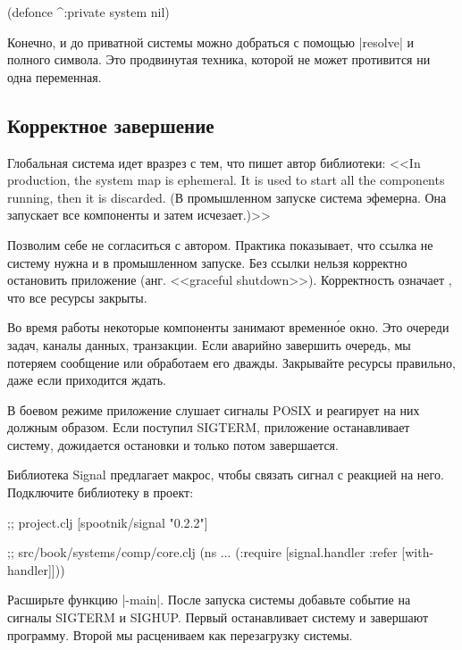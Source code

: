 \begin{english}
  \begin{clojure}
(defonce ^:private system nil)
  \end{clojure}
\end{english}

Конечно, и до приватной системы можно добраться с помощью \spverb|resolve| и
полного символа. Это продвинутая техника, которой не может противится ни одна
переменная.

\subsection{Корректное завершение}

Глобальная система идет вразрез с тем, что пишет автор библиотеки: <<In
production, the system map is ephemeral. It is used to start all the components
running, then it is discarded. (В промышленном запуске система эфемерна. Она
запускает все компоненты и затем исчезает.)>>

Позволим себе не согласиться с автором. Практика показывает, что ссылка не
систему нужна и в промышленном запуске. Без ссылки нельзя корректно остановить
приложение (анг. <<graceful shutdown>>). Корректность означает , что все ресурсы
закрыты.

Во время работы некоторые компоненты занимают временн\'{о}е окно. Это очереди
задач, каналы данных, транзакции. Если аварийно завершить очередь, мы потеряем
сообщение или обработаем его дважды. Закрывайте ресурсы правильно, даже если
приходится ждать.

В боевом режиме приложение слушает сигналы POSIX и реагирует на них должным
образом. Если поступил SIGTERM, приложение останавливает систему, дожидается
остановки и только потом завершается.

Библиотека Signal предлагает макрос,
чтобы связать сигнал с реакцией на него. Подключите библиотеку в проект:

\begin{english}
  \begin{clojure}
;; project.clj
[spootnik/signal "0.2.2"]

;; src/book/systems/comp/core.clj
(ns ...
  (:require [signal.handler :refer [with-handler]]))
  \end{clojure}
\end{english}

Расширьте функцию \spverb|-main|. После запуска системы добавьте событие на
сигналы SIGTERM и SIGHUP. Первый останавливает систему и завершают
программу. Второй мы расцениваем как перезагрузку системы.

